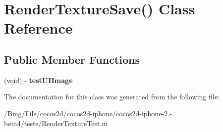 \hypertarget{interface_render_texture_save_07_08}{\section{Render\-Texture\-Save() Class Reference}
\label{interface_render_texture_save_07_08}
}
\subsection*{Public Member Functions}
\begin{DoxyCompactItemize}
\item 
\hypertarget{interface_render_texture_save_07_08_a168e06aa85d475dfd3350631b0739f1a}{(void) -\/ {\bfseries test\-U\-I\-Image}}\label{interface_render_texture_save_07_08_a168e06aa85d475dfd3350631b0739f1a}

\end{DoxyCompactItemize}


The documentation for this class was generated from the following file\-:\begin{DoxyCompactItemize}
\item 
/\-Bing/\-File/cocos2d/cocos2d-\/iphone/cocos2d-\/iphone-\/2.-\/beta4/tests/Render\-Texture\-Test.\-m\end{DoxyCompactItemize}
